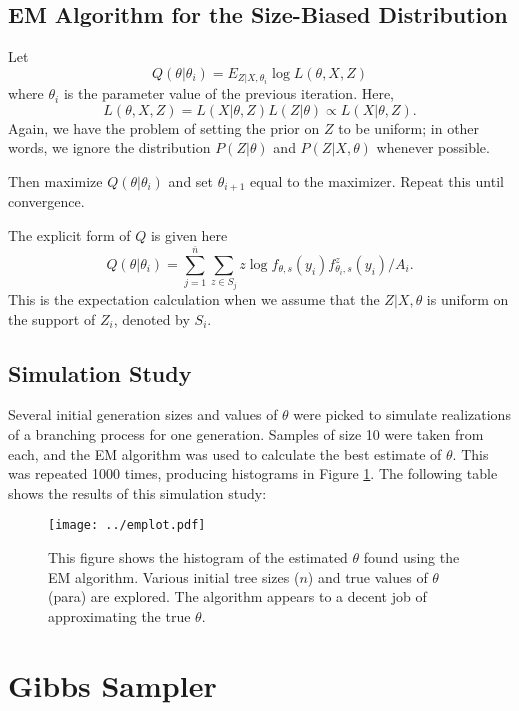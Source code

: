 \documentclass[11 pt]{article}
\renewcommand{\th}{\theta}
\newcommand{\fths}{f_{\th,s}}
\begin{document}
\subsection{EM Algorithm for the Size-Biased Distribution}

Let
\[
Q(\th | \th_i) = E_{Z|X,\th_i} \log L(\th,X,Z)
\]
where $\th_i$ is the parameter value of the previous iteration. Here,
\[
L(\th,X,Z) = L(X | \th, Z) L(Z | \th) \propto L(X | \th, Z).
\] 
Again, we have the problem of setting the prior on $Z$ to be uniform; in other words, we ignore the distribution $P(Z | \th)$ and $P(Z | X, \th)$ whenever possible.


Then maximize $Q(\th|\th_i)$ and set $\th_{i+1}$ equal to the maximizer. Repeat this until convergence.

The explicit form of $Q$ is given here
\[
Q(\th | \th_i) = \sum_{j=1}^{\bar{n}} \sum_{z \in S_j} z \log \fths (y_i) f^z_{\th_i,s}(y_i) / A_i.
\]
This is the expectation calculation when we assume that the $Z | X, \th$ is uniform on the support of $Z_i$, denoted by $S_i$.

\subsection{Simulation Study}

Several initial generation sizes and values of $\th$ were picked to simulate realizations of a branching process for one generation. Samples of size 10 were taken from each, and the EM algorithm was used to calculate the best estimate of $\th$. This was repeated 1000 times, producing histograms in Figure \ref{fig:em}. The following table shows the results of this simulation study:




\begin{figure}[h]
\begin{center}
\texttt{[image: ../emplot.pdf]}
\caption{This figure shows the histogram of the estimated $\th$ found using the EM algorithm. Various initial tree sizes ($n$) and true values of $\th$ (para) are explored. The algorithm appears to a decent job of approximating the true $\th$.}
\label{fig:em}
\end{center}
\end{figure}

\section{Gibbs Sampler}
\end{document}
